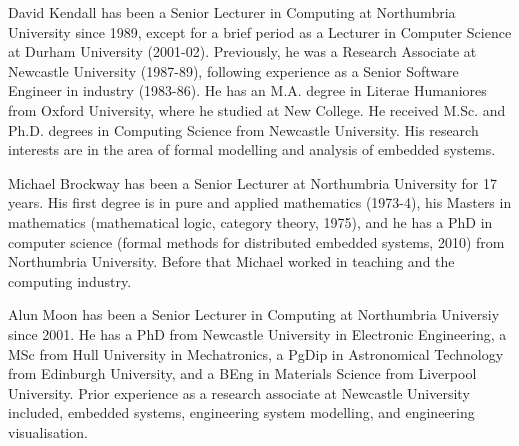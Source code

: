 \documentclass{ieeeaccess}
\begin{document}
\begin{IEEEbiography}{David Kendall}
has been a Senior Lecturer in Computing at Northumbria University since 1989, except for a brief period as a Lecturer in Computer Science at Durham University (2001-02). Previously, he was a Research Associate at Newcastle University (1987-89), following experience as a Senior Software Engineer in industry (1983-86). He has an M.A. degree in Literae Humaniores from Oxford University, where he studied at New College. He received M.Sc. and Ph.D. degrees in Computing Science from Newcastle University. His research interests are in the area of formal modelling and analysis of embedded systems. 
\end{IEEEbiography}

\begin{IEEEbiography}{Michael Brockway}
has been a Senior Lecturer at Northumbria University for 17 years. His first degree is in pure and applied mathematics (1973-4), his Masters in mathematics (mathematical logic, category theory, 1975), and he has a PhD in computer science (formal methods for distributed embedded systems, 2010) from Northumbria University. Before that Michael worked in teaching and the computing industry.
\end{IEEEbiography}

\begin{IEEEbiography}{Alun Moon} has been a Senior Lecturer in Computing at Northumbria Universiy since 2001. He has a PhD from Newcastle University in Electronic Engineering, a MSc from Hull University in Mechatronics, a PgDip in Astronomical Technology from Edinburgh University, and a BEng in Materials Science from Liverpool University.
Prior experience as a research associate at Newcastle University included, embedded systems, engineering system modelling, and engineering visualisation.
\end{IEEEbiography}  
  
\EOD
\end{document}

